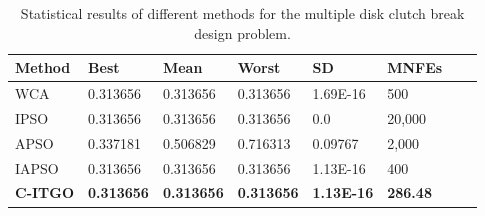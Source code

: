 
\begin{table*}[h]
    \tiny
    \begin{center}
    
    \begin{tabular}{ P{2.0cm} P{2.0cm} P{2.0cm} P{2.0cm} P{2.0cm} P{2.0cm} P{2.0cm} P{2.0cm}  }
    \hline
    \textbf{Method} & \textbf{Best} & \textbf{Mean} & \textbf{Worst} & \textbf{SD} & \textbf{MNFEs} \\
    \hline

    WCA & 0.313656 & 0.313656 & 0.313656 & 1.69E-16 & 500 \\
    IPSO & 0.313656 & 0.313656 & 0.313656 & 0.0 & 20,000 \\
    APSO & 0.337181 & 0.506829 & 0.716313 & 0.09767 & 2,000 \\    
    IAPSO & 0.313656 & 0.313656 & 0.313656 & 1.13E-16 & 400 \\
    \textbf{C-ITGO} & \bf{0.313656} & \bf{0.313656} & \bf{0.313656} & \bf{1.13E-16} & \bf{286.48} \\

    \hline
    \end{tabular}
    \end{center}
    \vspace*{-6mm}
    \caption{Statistical results of different methods for the multiple disk clutch break design problem. \\[1em]}
    \label{tab:MD}
    \end{table*}
    
    
